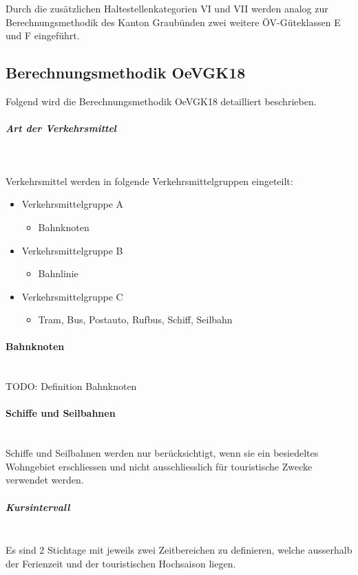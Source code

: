 Durch die zusätzlichen Haltestellenkategorien VI und VII werden analog zur Berechnungsmethodik des Kanton Graubünden zwei weitere ÖV-Güteklassen E und F eingeführt.

\subsection{Berechnungsmethodik OeVGK18}
\label{Berechnungsmethodik OeVGK18}
Folgend wird die Berechnungsmethodik \gls{OeVGK18} detailliert beschrieben.

\subparagraph{Art der Verkehrsmittel}~\\
\label{Berechnungsmethodik OeVGK18:Art der Verkehrsmittel}

Verkehrsmittel werden in folgende Verkehrsmittelgruppen eingeteilt:

\begin{itemize}[noitemsep]
    \item Verkehrsmittelgruppe A
    \begin{itemize}
        \item Bahnknoten
    \end{itemize}
    \item Verkehrsmittelgruppe B
    \begin{itemize}
        \item Bahnlinie
    \end{itemize}
    \item Verkehrsmittelgruppe C
    \begin{itemize}
        \item Tram, Bus, Postauto, Rufbus, Schiff, Seilbahn
    \end{itemize}
\end{itemize}

\paragraph{Bahnknoten}~\\
TODO: Definition Bahnknoten

\paragraph{Schiffe und Seilbahnen}~\\
Schiffe und Seilbahnen werden nur berücksichtigt, wenn sie ein besiedeltes Wohngebiet erschliessen und nicht ausschliesslich für touristische Zwecke verwendet werden.


\subparagraph{Kursintervall}~\\
\label{Berechnungsmethodik OeVGK18:Kursintervall}
Es sind 2 Stichtage mit jeweils zwei Zeitbereichen zu definieren, welche ausserhalb der Ferienzeit und der touristischen Hochsaison liegen.

